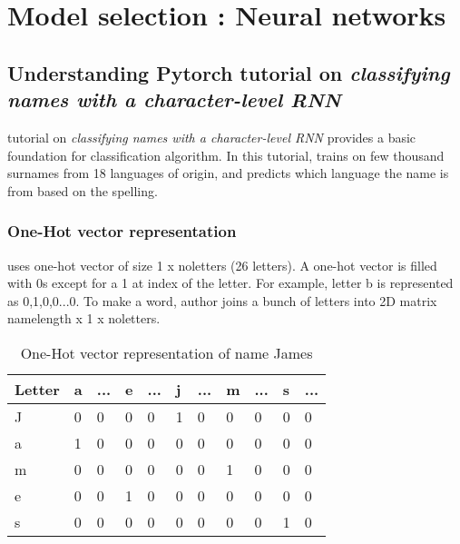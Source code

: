 \chapter{Model selection : Neural networks}

\section{Understanding Pytorch tutorial on \textit{classifying names with a character-level \acs{RNN}} } \label{sec:chRNN}

\parencite{sean} tutorial on \textit{classifying names with a character-level \acs{RNN}} provides a basic foundation for classification algorithm. In this tutorial,  trains on few thousand surnames from 18 languages of origin, and predicts which language the name is from based on the spelling.
\subsection{One-Hot vector representation}
 uses one-hot vector of size 1 x no\textunderscore letters (26 letters). A one-hot vector is filled with 0s except for a 1 at index of the letter. For example, letter b is represented as 0,1,0,0...0. To make a word, author joins a bunch of letters into 2D matrix name\textunderscore length x 1 x no\textunderscore letters.

\begin{table}[h]
    \centering
    \caption{One-Hot vector representation of name James}
    \label{table:feature_imputation}
    \begin{tabular}{ lllllllllll }
          \toprule
          
          \textbf{Letter}& \textbf{a} & \textbf{...}& \textbf{e}&\textbf{...}&\textbf{j}&\textbf{...}&\textbf{m}&\textbf{...}&\textbf{s}&\textbf{...}\\
          \midrule
          J&0 & 0& 0& 0&1& 0& 0& 0& 0& 0\\
          a&1 & 0& 0& 0&0& 0& 0& 0& 0& 0\\         
          m&0 & 0& 0& 0&0& 0& 1& 0& 0& 0\\
          e&0 & 0& 1& 0&0& 0& 0& 0& 0& 0\\
          s&0 & 0& 0& 0&0& 0& 0& 0& 1& 0\\           
        
          \bottomrule
          \end{tabular}
\end{table}

